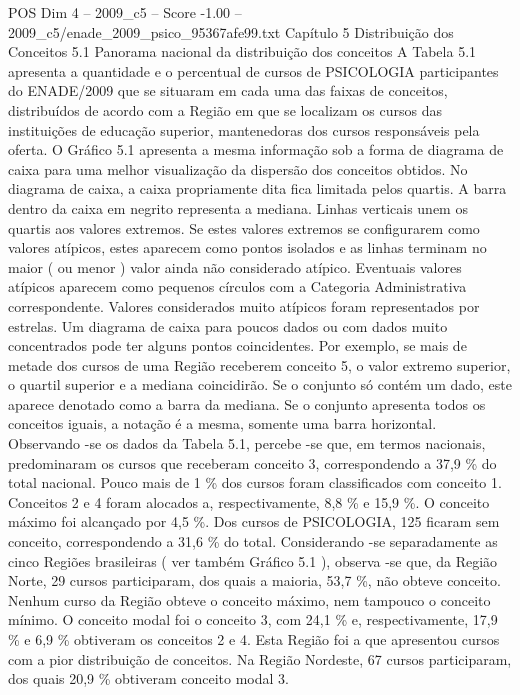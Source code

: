 \begin{textsample}{POS Dim 4 – 2009\_c5 – Score -1.00 – 2009\_c5/enade\_2009\_psico\_95367afe99.txt}  \label{ex:f4_pos_267}
Capítulo 5 Distribuição dos Conceitos 5.1 Panorama nacional da distribuição dos conceitos A Tabela 5.1 apresenta a quantidade e o percentual de cursos de PSICOLOGIA participantes do ENADE/2009 que se situaram em cada uma das faixas de conceitos, distribuídos de acordo com a Região em que se localizam os cursos das instituições de educação superior, mantenedoras dos cursos responsáveis pela oferta.
O Gráfico 5.1 apresenta a mesma informação sob a forma de diagrama de caixa para uma melhor visualização da dispersão dos conceitos obtidos.
No diagrama de caixa, a caixa propriamente dita fica limitada pelos quartis.
A barra dentro da caixa em negrito representa a mediana.
Linhas verticais unem os quartis aos valores extremos.
Se estes valores extremos se configurarem como valores atípicos, estes aparecem como pontos isolados e as linhas terminam no maior ( ou menor ) valor ainda não considerado atípico.
Eventuais valores atípicos aparecem como pequenos círculos com a Categoria Administrativa correspondente.
Valores considerados muito atípicos foram representados por estrelas.
Um diagrama de caixa para poucos dados ou com dados muito concentrados pode ter alguns pontos coincidentes.
Por exemplo, se mais de metade dos cursos de uma Região receberem conceito 5, o valor extremo superior, o quartil superior e a mediana coincidirão.
Se o conjunto só contém um dado, este aparece denotado como a barra da mediana.
Se o conjunto apresenta todos os conceitos iguais, a notação é a mesma, somente uma barra horizontal.
Observando -se os dados da Tabela 5.1, percebe -se que, em termos nacionais, predominaram os cursos que receberam conceito 3, correspondendo a 37,9 \% do total nacional.
Pouco mais de 1 \% dos cursos foram classificados com conceito 1.
Conceitos 2 e 4 foram alocados a, respectivamente, 8,8 \% e 15,9 \%.
O conceito máximo foi alcançado por 4,5 \%.
Dos cursos de PSICOLOGIA, 125 ficaram sem conceito, correspondendo a 31,6 \% do total.
Considerando -se separadamente as cinco Regiões brasileiras ( ver também Gráfico 5.1 ), observa -se que, da Região Norte, 29 cursos participaram, dos quais a maioria, 53,7 \%, não obteve conceito.
Nenhum curso da Região obteve o conceito máximo, nem tampouco o conceito mínimo.
O conceito modal foi o conceito 3, com 24,1 \% e, respectivamente, 17,9 \% e 6,9 \% obtiveram os conceitos 2 e 4.
Esta Região foi a que apresentou cursos com a pior distribuição de conceitos.
Na Região Nordeste, 67 cursos participaram, dos quais 20,9 \% obtiveram conceito modal 3.

\end{textsample}
